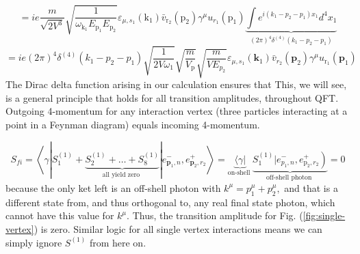 $$
=ie \frac{m}{\sqrt{2 V^{3}}} \sqrt{\frac{1}{\omega_{\mathrm{k}_{1}} E_{\mathrm{p}_{1}} E_{\mathrm{p}_{2}}}} \varepsilon_{\mu, s_{1}}\left(\mathrm{k}_{1}\right) \bar{v}_{\mathrm{r}_{2}}\left(\mathrm{p}_{2}\right) \gamma^{\mu} u_{r_1}\left(\mathrm{p}_{1}\right)\underbrace{\int e^{i\left(k_{1}-p_{2}-p_{1}\right) x_{1}} d^{4} x_{1}}_{(2 \pi)^{4} \delta^{(4)}\left(k_{1}-p_{2}-p_{1}\right)}
$$
$$
=i e(2 \pi)^{4} \delta^{(4)}\left(k_{1}-p_{2}-p_{1}\right) \sqrt{\frac{1}{2 V \omega_{1}}} \sqrt{\frac{m}{V_{\mathrm{p}}}} \sqrt{\frac{m}{V E_{p_{2}}}} \varepsilon_{\mu, s_{1}}\left(\mathbf{k}_{1}\right) \bar{v}_{r_{2}}\left(\mathbf{p}_{2}\right) \gamma^{\mu} u_{\mathrm{r_1}}\left(\mathbf{p}_{1}\right)
$$
The Dirac delta function arising
in our calculation ensures that  This, we will see, is a general principle that holds for all transition amplitudes, throughout QFT. Outgoing 4-momentum for any interaction vertex (three particles interacting at a
point in a Feynman diagram) equals incoming 4-momentum.

\textbf{}
\begin{qt}
    $$
S_{f i}=\left\langle\gamma\left|S_{1}^{(1)} +\underbrace{S_{2}^{(1)}+\ldots+S_{8}^{(1)}}_{\text {all yield zero }}\right| e_{\mathbf{p}_{1}, n}^{-}, e_{\mathbf{p}_{2}, r_{2}}^{+}\right\rangle=\underbrace{\langle\gamma|}_{\text {on-shell }} \underbrace{\left.S_{1}^{(1)} | e_{p_{1}, n}^{-}, e^{+}_{\mathrm{p}_{2}, r_{2}}\right)}_{\text {off-shell photon }}=0
$$
because the only ket left is an off-shell photon with $k^{\mu}=p_{1}^{\mu}+p_{2}^{\mu},$ and that is a different state from, and thus orthogonal to, any real final state photon, which cannot have this value for $k^{\mu} .$ Thus, the transition amplitude for Fig. (\ref{fig:single-vertex}) is zero. Similar logic for all single vertex interactions means we can simply ignore $S^{(1)}$ from here on.
\end{qt}